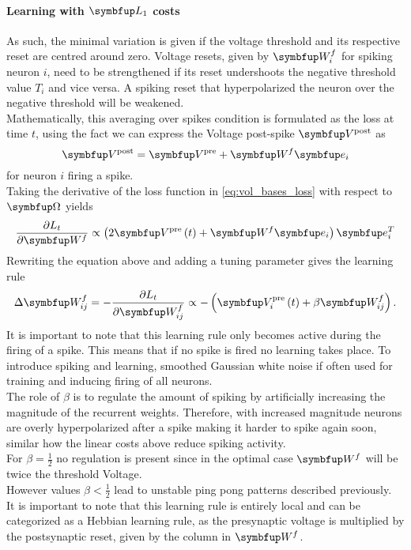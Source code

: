 \paragraph{Learning with $\bmu{L_1}$ costs}
As such, the minimal variation is given if the voltage threshold and its respective reset are centred around zero. Voltage resets, given by $\bmu{W}^f_i$ for spiking neuron $i$, need to be strengthened if its reset undershoots the negative threshold value $T_i$ and vice versa. A spiking reset that hyperpolarized the neuron over the negative threshold will be weakened.\\
Mathematically, this averaging over spikes condition is formulated as the loss at time $t$, using the fact we can express the Voltage post-spike $\bmu{V}^{\text {post}}$ as
\begin{equation}
	\bmu{V}^{\text {post}} = \bmu{V}^{\text {pre}} + \bmu{W}^f \bmu{e}_i
\end{equation}
for neuron $i$ firing a spike.\\
Taking the derivative of the loss function in \cref{eq:vol_bases_loss} with respect to $\bmu{\Omega}$ yields
\begin{equation}
\frac{\partial L_t}{\partial \bmu{W}^f} \propto\left(2 \bmu{V}^{\text {pre}}\left(t\right)+\bmu{W}^f \bmu{e}_{i}\right) \bmu{e}_{i}^{T}
\end{equation}
Rewriting the equation above and adding a tuning parameter gives the learning rule
\begin{equation}
	\Delta \bmu{W}^f_{ij} =-\frac{\partial L_t}{\partial \bmu{W}^f_{ij}} \propto - \left( \bmu{V}_i^{\text {pre}}\left(t\right)+\beta \bmu{W}^f_{ij}\right).
\end{equation}
It is important to note that this learning rule only becomes active during the firing of a spike. This means that if no spike is fired no learning takes place. To introduce spiking and learning, smoothed  Gaussian white noise if often used for training and inducing firing of all neurons.\\
The role of $\beta$ is to regulate the amount of spiking by artificially increasing the magnitude of the recurrent weights. Therefore, with increased magnitude neurons are overly hyperpolarized after a spike making it harder to spike again soon, similar how the linear costs above reduce spiking activity.\\
For $\beta = \frac{1}{2}$ no regulation is present since in the optimal case  $\bmu{W}^f$ will be twice the threshold Voltage.\\
However values $\beta<\frac{1}{2}$ lead to unstable ping pong patterns described previously.\\
It is important to note that this learning rule is entirely local and can be categorized as a Hebbian learning rule, as the presynaptic voltage is multiplied by the postsynaptic reset, given by the column in $\bmu{W}^f$.\\
